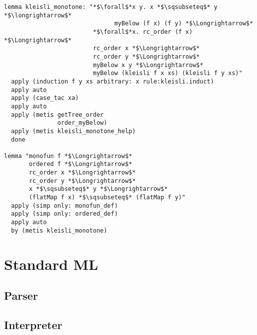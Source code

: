 \begin{lstlisting}[language=Isabelle]
lemma kleisli_monotone: "*$\forall$*x y. x *$\sqsubseteq$* y *$\longrightarrow$* 
                               myBelow (f x) (f y) *$\Longrightarrow$*
                         *$\forall$*x. rc_order (f x) *$\Longrightarrow$*
                         rc_order x *$\Longrightarrow$*
                         rc_order y *$\Longrightarrow$* 
                         myBelow x y *$\Longrightarrow$* 
                         myBelow (kleisli f x xs) (kleisli f y xs)"
  apply (induction f y xs arbitrary: x rule:kleisli.induct)
  apply auto
  apply (case_tac xa)
  apply auto
  apply (metis getTree_order 
               order_myBelow)
  apply (metis kleisli_monotone_help)
  done  
  
lemma "monofun f *$\Longrightarrow$* 
       ordered f *$\Longrightarrow$* 
       rc_order x *$\Longrightarrow$* 
       rc_order y *$\Longrightarrow$* 
       x *$\sqsubseteq$* y *$\Longrightarrow$* 
       (flatMap f x) *$\sqsubseteq$* (flatMap f y)"
  apply (simp only: monofun_def)
  apply (simp only: ordered_def)
  apply auto
  by (metis kleisli_monotone)

\end{lstlisting}

\newpage

\section{Standard ML}

\subsection{Parser}



\newpage

\subsection{Interpreter}

